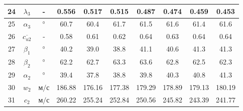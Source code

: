 \begin{landscape}
\begin{center}
\begin{longtable}{|c|c|c|c|c|c|c|c|c|c|}
				24 & $\lambda_3$ & - & 0.556 & 0.517 & 0.515 & 0.487 & 0.474 & 0.459 & 0.453 \\\hline
			
				25 & $\alpha_3$ & $\degree$ & 60.7 & 60.4 & 61.7 & 61.5 & 61.6 & 61.4 & 61.6 \\\hline
			
				26 & $\overline{c_{u2}}$ & - & 0.58 & 0.61 & 0.62 & 0.64 & 0.63 & 0.64 & 0.64 \\\hline
			
				27 & $\beta_1$ & $\degree$ & 40.2 & 39.0 & 38.8 & 41.1 & 40.6 & 41.3 & 41.3 \\\hline
			
				28 & $\beta_2$ & $\degree$ & 62.2 & 62.7 & 63.3 & 63.6 & 62.8 & 62.5 & 62.3 \\\hline
			
				29 & $\alpha_2$ & $\degree$ & 39.4 & 37.8 & 38.8 & 39.8 & 40.3 & 40.8 & 41.3 \\\hline
			
				30 & $w_2$ & $м/с$ & 186.88 & 176.16 & 177.38 & 179.29 & 178.89 & 179.13 & 180.19 \\\hline
			
				31 & $c_2$ & $м/с$ & 260.22 & 255.24 & 252.84 & 250.56 & 245.82 & 243.39 & 241.77 \\\hline
			
		\end{longtable}
	\end{center}
\end{landscape}
